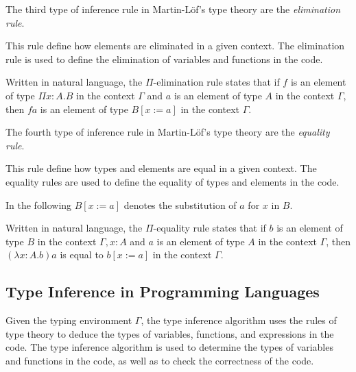 The third type of inference rule in Martin-L\"of's type theory are the \textit{elimination rule}.
\begin{tcolorbox}[myboxstyle=black, title=Elimination Rule]
    This rule define how elements are eliminated in a given context. The elimination rule is used to define the elimination of variables and functions in the code.
    \begin{prooftree}
    \end{prooftree}
    \tcblower
    Written in natural language, the $\Pi$-elimination rule states that if $f$ is an element of type $\Pi x : A. B$ in the context $\Gamma$ and $a$ is an element of type $A$ in the context $\Gamma$, then $f a$ is an element of type $B[x := a]$ in the context $\Gamma$.
\end{tcolorbox}

The fourth type of inference rule in Martin-L\"of's type theory are the \textit{equality rule}.
\begin{tcolorbox}[myboxstyle=black, title=Equality Rule]
    This rule define how types and elements are equal in a given context. The equality rules are used to define the equality of types and elements in the code.

    In the following $B[x := a]$ denotes the substitution of $a$ for $x$ in $B$.
    \begin{prooftree}
    \end{prooftree}
    \tcblower
    Written in natural language, the $\Pi$-equality rule states that if $b$ is an element of type $B$ in the context $\Gamma, x : A$ and $a$ is an element of type $A$ in the context $\Gamma$, then $(\lambda x : A. b) a$ is equal to $b[x := a]$ in the context $\Gamma$.
\end{tcolorbox}

\subsection{Type Inference in Programming Languages}\label{subsubsec:TypeInferenceInProgrammingLanguages}

Given the typing environment $\Gamma$, the type inference algorithm uses the rules of type theory to deduce the types of variables, functions, and expressions in the code. The type inference algorithm is used to determine the types of variables and functions in the code, as well as to check the correctness of the code.

